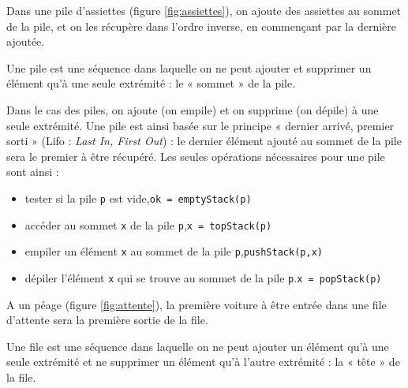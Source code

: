 \begin{ex}\label{ex:assiettes}
Dans une pile d'assiettes (figure \ref{fig:assiettes}),
on ajoute des assiettes au sommet de la pile, et on les récupère dans l'ordre inverse, 
en commençant par la dernière ajoutée.
\end{ex}

\begin{defin}[pile]
Une pile est une séquence dans laquelle on ne peut ajouter et supprimer un élément
qu'à une seule extrémité : le « sommet » de la pile.
\end{defin}

Dans le cas des piles, on ajoute (on empile) et on supprime (on dépile) à une
seule extrémité. Une pile est ainsi basée sur le principe
« dernier arrivé, premier sorti » ({\sc Lifo} : {\em Last In, First Out}) : 
le dernier élément ajouté au sommet de la pile sera le premier à être récupéré. 
Les seules opérations nécessaires pour une pile sont ainsi :
\begin{itemize}
\item tester si la pile {\tt p} est vide,\hfill{\tt ok = emptyStack(p)}
\item accéder au sommet {\tt x} de la pile {\tt p},\hfill{\tt x = topStack(p)}
\item empiler un élément {\tt x} au sommet de la pile {\tt p},\hfill{\tt pushStack(p,x)}
\item dépiler l'élément {\tt x} qui se trouve au sommet de la pile {\tt p}.\hfill{\tt x = popStack(p)}
\end{itemize}

\begin{ex}\label{ex:attente}
A un péage (figure \ref{fig:attente}), la première voiture à être entrée dans une file d'attente
sera la première sortie de la file.
\end{ex}

\begin{defin}[file]
Une file est une séquence dans laquelle on ne peut ajouter un élément qu'à une seule extrémité 
et ne supprimer un élément qu'à l'autre extrémité : la « tête » de la file.
\end{defin}

